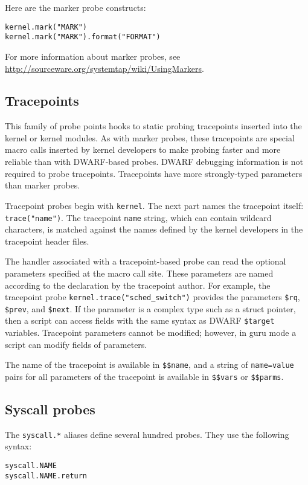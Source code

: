 \documentclass[twoside,english]{article}
\newenvironment{vindent}
{\begin{list}{}{\setlength{\listparindent}{6pt}}
\item[]}
{\end{list}}
\begin{document}
Here are the marker probe constructs:
\begin{vindent}
\begin{verbatim}
kernel.mark("MARK")
kernel.mark("MARK").format("FORMAT")
\end{verbatim}
\end{vindent}

For more information about marker probes, see
\url{http://sourceware.org/systemtap/wiki/UsingMarkers}.


\subsection{Tracepoints}
\label{sec:tracepoints}

This family of probe points hooks to static probing tracepoints
inserted into the kernel or kernel modules.  As with marker probes,
these tracepoints are special macro calls inserted by kernel
developers to make probing faster and more reliable than with
DWARF-based probes.  DWARF debugging information is not required to
probe tracepoints.  Tracepoints have more strongly-typed parameters
than marker probes.

Tracepoint probes begin with \texttt{kernel}.  The next part names the
tracepoint itself: \texttt{trace("name")}.  The tracepoint
\texttt{name} string, which can contain wildcard characters, is
matched against the names defined by the kernel developers in the
tracepoint header files.

The handler associated with a tracepoint-based probe can read the
optional parameters specified at the macro call site.  These
parameters are named according to the declaration by the tracepoint
author.  For example, the tracepoint probe
\texttt{kernel.trace("sched\_switch")} provides the parameters
\texttt{\$rq}, \texttt{\$prev}, and \texttt{\$next}.  If the parameter
is a complex type such as a struct pointer, then a script can access
fields with the same syntax as DWARF \texttt{\$target} variables.
Tracepoint parameters cannot be modified; however, in guru mode a
script can modify fields of parameters.

The name of the tracepoint is available in \texttt{\$\$name}, and a
string of \texttt{name=value} pairs for all parameters of the
tracepoint is available in \texttt{\$\$vars} or \texttt{\$\$parms}.


\subsection{Syscall probes}
\label{sec:syscall}
The \texttt{syscall.*}  aliases define several hundred probes.  They
use the following syntax:
\begin{vindent}
\begin{verbatim}
syscall.NAME
syscall.NAME.return
\end{verbatim}
\end{vindent}
\end{document}

